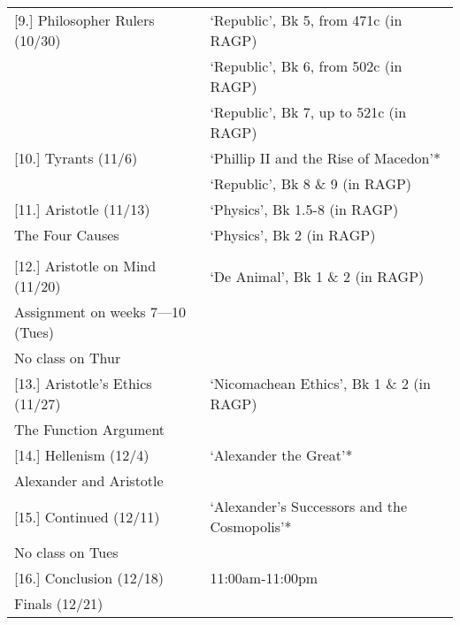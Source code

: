 \documentclass[article,oneside]{memoir}
\begin{document}
\begin{center}
\begin{longtable}{p{4.75cm}p{8.5cm}}
  							
[9.] Philosopher Rulers (10/30) 		& `Republic', Bk 5, from 471c (in RAGP) \\ 
						 	& `Republic', Bk 6, from 502c (in RAGP) \\ 
						 	& `Republic', Bk 7, up to 521c (in RAGP) \\ [1\baselineskip] \midrule


[10.] Tyrants (11/6)				& `Phillip II and the Rise of Macedon'* \\
			       				& `Republic', Bk 8 \& 9 (in RAGP) \\ [1\baselineskip] \midrule

	

[11.] Aristotle (11/13)		 		& `Physics',  Bk 1.5-8 (in RAGP)  \\ 
The Four Causes				& `Physics', Bk 2 (in RAGP) \\  \\ [1\baselineskip] \midrule
						
					
[12.] Aristotle on Mind (11/20)	 	& `De Animal', Bk 1 \& 2 (in RAGP) \\
Assignment on weeks 7---10 (Tues)  & 	 \\ 		
No class on Thur				& 	 \\ 	[\baselineskip] \midrule		


			
[13.] Aristotle's Ethics (11/27)		 & `Nicomachean Ethics', Bk 1 \& 2 (in RAGP) \\
The Function Argument			& 	 \\ [\baselineskip] \midrule

[14.] Hellenism (12/4)			&  `Alexander the Great'* \\  
Alexander and Aristotle			&   \\  [1\baselineskip] \midrule


[15.] Continued (12/11) 			& `Alexander's Successors and the Cosmopolis'* \\ 
No class on Tues				& \\ [1\baselineskip] \midrule
	
[16.] Conclusion (12/18) 			& 11:00am-11:00pm \\ 
Finals (12/21)					& \\ [1\baselineskip] \midrule

	

\end{longtable}
\end{center}
\end{document}
